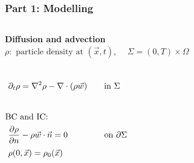 \documentclass[aspectratio=169,xcolor=dvipsnames]{beamer}
\begin{document}
\begin{frame}
	\frametitle{Part 1: Modelling}
	\begin{columns}
		\textbf{Diffusion and advection} \\
		$	\rho: \text{ particle density at } (\vec{x},t)$, 
		$\quad \Sigma = (0,T) \times \Omega$
		\begin{align*}
		\\
		\partial_t \rho &= \nabla^2 \rho - \nabla \cdot (\rho \vec{w}) \qquad\text{in    } \Sigma\phantom{ + \nabla \cdot \int_\Omega \rho(\vec{x}) \rho(\vec{x}\hspace{0.2em}') \nabla V_2(|\vec{x}-\vec{x}\hspace{0.2em}'|)d\vec{x}\hspace{0.2em}'} \\
		\\
		\text{BC }& \text{and IC:}\\
		\frac{\partial \rho}{\partial n}& - \rho \vec{w} \cdot \vec{n}  = 0\ \qquad \qquad\text{on   } \partial \Sigma \phantom{+ \int_\Omega \rho(\vec{x}) \rho(\vec{x}\hspace{0.2em}')  \frac{ \partial  V_2}{\partial n}(|\vec{x}-\vec{x}\hspace{0.2em}'|)d\vec{x}\hspace{0.2em}'}    \\
		\rho(0&,\vec{x}) = \rho_0(\vec{x}) 
		\end{align*}
		\vspace{-1cm}
		\begin{figure}
			\includegraphics[width=3cm]{bloodcells.jpg}\\
			\includegraphics[width=3cm]{bacteria.png}\\
			\includegraphics[width=3cm]{Microfilter.png}\\
			\includegraphics[width=3cm]{beer.png}
		\end{figure}
	\end{columns}
\end{frame}
\end{document}
